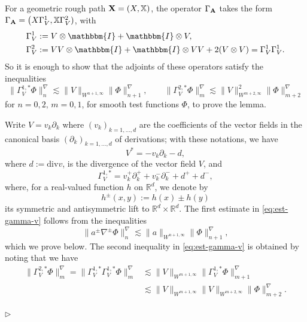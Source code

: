 \documentclass[11pt,a4paper]{amsart}
\newcommand{\RR}{\mathbb{R}}  \newcommand{\CC}{\mathbb{C}}  \newcommand{\LL}{\mathbb{L}}  \newcommand{\WW}{\mathbb{W}}
\newcommand{\bbX}{\mathbb{X}}
\newcommand{\ssk}{\smallskip}
\numberwithin{equation}{section} %
\newenvironment{Dem}{%
    \begin{list}{\hspace{0.5cm}{\sc Proof --}}{%
        \setlength{\topsep}{0pt}%
        \setlength{\leftmargin}{0pt}%
        \setlength{\rightmargin}{0pt}%
        \setlength{\listparindent}{0pt}%
        \setlength{\itemindent}{0pt}%
        \setlength{\parsep}{0pt}%
        \addtolength{\leftmargin}{20pt}%
        \addtolength{\rightmargin}{0pt}%
    } \item }{\hfill{\space $\rhd$}\end{list}\smallskip}
\begin{document}
\begin{Dem}
For a  geometric rough path $\bfX = (X,\bbX)$, the operator $\Gamma_{\bf A}$ takes the form $\Gamma_{\bfA} = \big(X  \Gamma_{V}^{1}, \bbX \Gamma_{V}^{2})$, with
\begin{equation*}
\begin{split}
&\Gamma_{V}^{1} := V  \otimes \mathbbm{I}+\mathbbm{I} \otimes V, \\
&\Gamma_{V}^{2} := V V \otimes \mathbbm{I}+\mathbbm{I} \otimes V V + 2 (V \otimes V) = \Gamma_{V}^{1} \Gamma_{V}^{1}.
\end{split}
\end{equation*}
So  it is enough to show that the adjoints of these operators satisfy the inequalities
\begin{equation}
\label{eq:est-gamma-v}
\|\Gamma_{V}^{1,\ast} \Phi\|^\nabla_{n} \lesssim \|V\|_{W^{n+1,\infty}} \|\Phi\|^\nabla_{n+1},
\qquad
\|\Gamma_{V}^{2,\ast} \Phi\|^\nabla_{m} \lesssim \|V\|_{W^{m+2,\infty}}^2 \|\Phi\|^\nabla_{m+2}
\end{equation}
for $n=0,2,\,m=0,1$, for smooth test functions $\Phi$, to prove the lemma.

\ssk

Write $V = v_k \partial_k$ where $(v_k)_{k=1,\dots,d}$ are the coefficients of the vector fields in the canonical basis $(\partial_k)_{k=1,\dots,d}$ of derivations; with these notations, we have
$$
V^\ast = - v_k \partial_k - d,
$$ 
where $d := \textrm{div} v$, is the divergence of the vector field $V$, and
$$
\Gamma_{V}^{1,\ast} = v^+_k \partial^+_k + v^-_k \partial^-_k + d^+ + d^-,
$$  
where, for a real-valued function $h$ on $\RR^d$, we denote by
$$
h^\pm(x,y) := h(x) \pm h(y)
$$ 
its symmetric and antisymmetric lift to $\RR^d \times \RR^d$. The first estimate in \eqref{eq:est-gamma-v} follows from the inequalities
$$
\big\| a^{\pm} \nabla^{\pm} \Phi\big\|^\nabla_{n} \lesssim \|a\|_{W^{n+1,\infty}} \|\Phi\|^\nabla_{n+1},
$$ 
which we prove below. The second inequality in \eqref{eq:est-gamma-v} is obtained by noting that we have 
\begin{equation*}
\begin{split}
\|\Gamma_{V}^{2,\ast} \Phi\|^\nabla_{m} =  \|\Gamma_{V}^{1,\ast}\Gamma_{V}^{1,\ast} \Phi\|^\nabla_{m} &\lesssim \|V\|_{W^{m+1,\infty}} \|\Gamma_{V}^{1,\ast} \Phi\|^\nabla_{m+1} \\
&\lesssim \|V\|_{W^{m+1,\infty}} \|V\|_{W^{m+2,\infty}} \| \Phi\|^\nabla_{m+2}.
\end{split}
\end{equation*}


\end{Dem}
\end{document}
